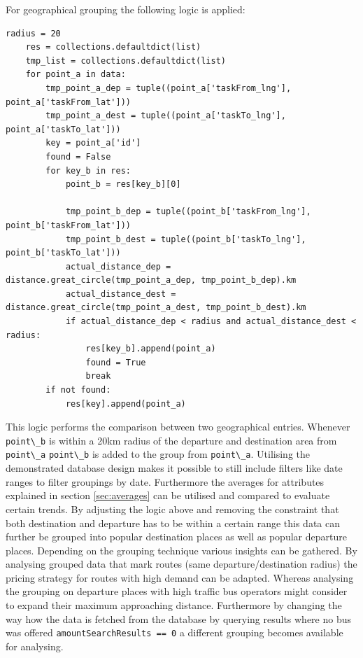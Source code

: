 For geographical grouping the following logic is applied:
\begin{lstlisting}
radius = 20
    res = collections.defaultdict(list)
    tmp_list = collections.defaultdict(list)
    for point_a in data:
        tmp_point_a_dep = tuple((point_a['taskFrom_lng'], point_a['taskFrom_lat']))
        tmp_point_a_dest = tuple((point_a['taskTo_lng'], point_a['taskTo_lat']))
        key = point_a['id']
        found = False
        for key_b in res:
            point_b = res[key_b][0]

            tmp_point_b_dep = tuple((point_b['taskFrom_lng'], point_b['taskFrom_lat']))
            tmp_point_b_dest = tuple((point_b['taskTo_lng'], point_b['taskTo_lat']))
            actual_distance_dep = distance.great_circle(tmp_point_a_dep, tmp_point_b_dep).km
            actual_distance_dest = distance.great_circle(tmp_point_a_dest, tmp_point_b_dest).km
            if actual_distance_dep < radius and actual_distance_dest < radius:
                res[key_b].append(point_a)
                found = True
                break
        if not found:
            res[key].append(point_a)
\end{lstlisting}
This logic performs the comparison between two geographical entries. Whenever \verb|point\_b| is within a 20km radius of the departure and destination area from \verb|point\_a| \verb|point\_b| is added to the group from \verb|point\_a|. Utilising the demonstrated database design makes it possible to still include filters like date ranges to filter groupings by date. Furthermore the averages for attributes explained in section \ref{sec:averages} can be utilised and compared to evaluate certain trends. By adjusting the logic above and removing the constraint that both destination and departure has to be within a certain range this data can further be grouped into popular destination places as well as popular departure places. Depending on the grouping technique various insights can be gathered. By analysing grouped data that mark routes (same departure/destination radius) the pricing strategy for routes with high demand can be adapted. Whereas analysing the grouping on departure places with high traffic bus operators might consider to expand their maximum approaching distance. Furthermore by changing the way how the data is fetched from the database by querying results where no bus was offered \verb|amountSearchResults == 0| a different grouping becomes available for analysing. 
